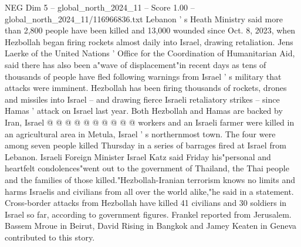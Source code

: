 \begin{textsample}{NEG Dim 5 – global\_north\_2024\_11 – Score 1.00 – global\_north\_2024\_11/116966836.txt}
Lebanon ' s Heath Ministry said more than 2,800 people have been killed and 13,000 wounded since Oct. 8, 2023, when Hezbollah began firing rockets almost daily into Israel, drawing retaliation.
Jens Laerke of the United Nations ' Office for the Coordination of Humanitarian Aid, said there has also been a"wave of displacement"in recent days as tens of thousands of people have fled following warnings from Israel ' s military that attacks were imminent.
Hezbollah has been firing thousands of rockets, drones and missiles into Israel -- and drawing fierce Israeli retaliatory strikes -- since Hamas ' attack on Israel last year.
Both Hezbollah and Hamas are backed by Iran, Israel @ @ @ @ @ @ @ @ @ @ workers and an Israeli farmer were killed in an agricultural area in Metula, Israel ' s northernmost town.
The four were among seven people killed Thursday in a series of barrages fired at Israel from Lebanon.
Israeli Foreign Minister Israel Katz said Friday his"personal and heartfelt condolences"went out to the government of Thailand, the Thai people and the families of those killed."Hezbollah-Iranian terrorism knows no limits and harms Israelis and civilians from all over the world alike,"he said in a statement.
Cross-border attacks from Hezbollah have killed 41 civilians and 30 soldiers in Israel so far, according to government figures.
Frankel reported from Jerusalem.
Bassem Mroue in Beirut, David Rising in Bangkok and Jamey Keaten in Geneva contributed to this story.

\end{textsample}
